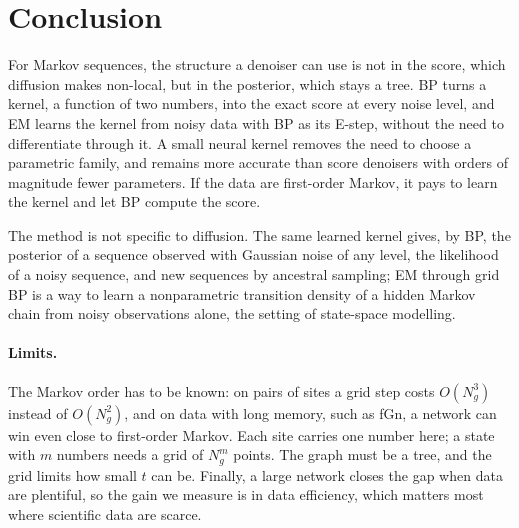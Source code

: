 \documentclass{article}
\begin{document}
\section{Conclusion}
\label{sec:conclusion}

For Markov sequences, the structure a denoiser can use is not in the score, which diffusion makes non-local, but in the
posterior, which stays a tree. BP turns a kernel, a function of two numbers, into the exact score at every noise level,
and EM learns the kernel from noisy data with BP as its E-step, without the need to differentiate through it. A small
neural kernel removes the need to choose a parametric family, and remains more accurate than score denoisers with orders
of magnitude fewer parameters. If the data are first-order Markov, it pays to learn the kernel and let BP compute the
score.

The method is not specific to diffusion. The same learned kernel gives, by BP, the posterior of a sequence observed with
Gaussian noise of any level, the likelihood of a noisy sequence, and new sequences by ancestral sampling; EM through grid
BP is a way to learn a nonparametric transition density of a hidden Markov chain from noisy observations alone, the
setting of state-space modelling.

\paragraph{Limits.} The Markov order has to be known: on pairs of sites a grid step costs $O(N_g^3)$ instead of
$O(N_g^2)$, and on data with long memory, such as fGn, a network can win even close to first-order Markov. Each site carries one number here; a state with $m$ numbers needs a grid of $N_g^m$ points. The graph must be
a tree, and the grid limits how small $t$ can be. Finally, a large network closes the gap when data are plentiful, so the
gain we measure is in data efficiency, which matters most where scientific data are scarce.
\end{document}
